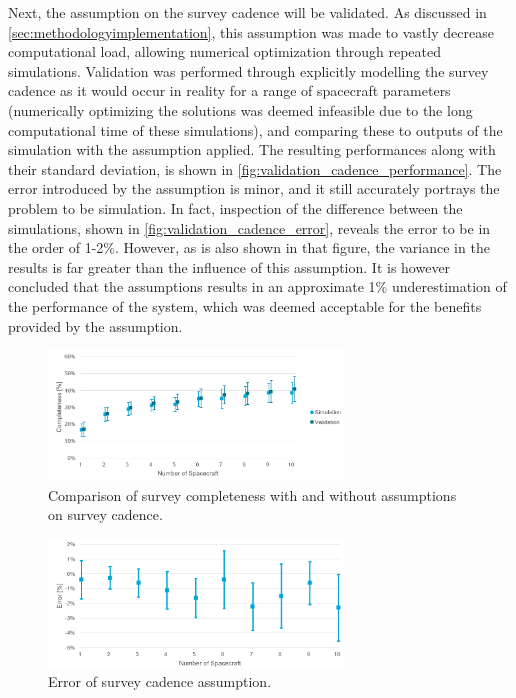 Next, the assumption on the survey cadence will be validated. As discussed in \autoref{sec:methodologyimplementation}, this assumption was made to vastly decrease computational load, allowing numerical optimization through repeated simulations. Validation was performed through explicitly modelling the survey cadence as it would occur in reality for a range of spacecraft parameters (numerically optimizing the solutions was deemed infeasible due to the long computational time of these simulations), and comparing these to outputs of the simulation with the assumption applied. The resulting performances along with their standard deviation, is shown in \autoref{fig:validation_cadence_performance}. The error introduced by the assumption is minor, and it still accurately portrays the problem to be simulation. In fact, inspection of the difference between the simulations, shown in \autoref{fig:validation_cadence_error}, reveals the error to be in the order of 1-2\%. However, as is also shown in that figure, the variance in the results is far greater than the influence of this assumption. It is however concluded that the assumptions results in an approximate 1\% underestimation of the performance of the system, which was deemed acceptable for the benefits provided by the assumption.

\begin{figure}[htbp]
 \centering
 \includegraphics[width=0.7\textwidth]{img/validation_cadence_performance.png}
 \caption{Comparison of survey completeness with and without assumptions on survey cadence.}
 \label{fig:validation_cadence_performance}
\end{figure}

\begin{figure}[htbp]
 \centering
 \includegraphics[width=0.7\textwidth]{img/validation_cadence_error.png}
 \caption{Error of survey cadence assumption.}
 \label{fig:validation_cadence_error}
\end{figure}

